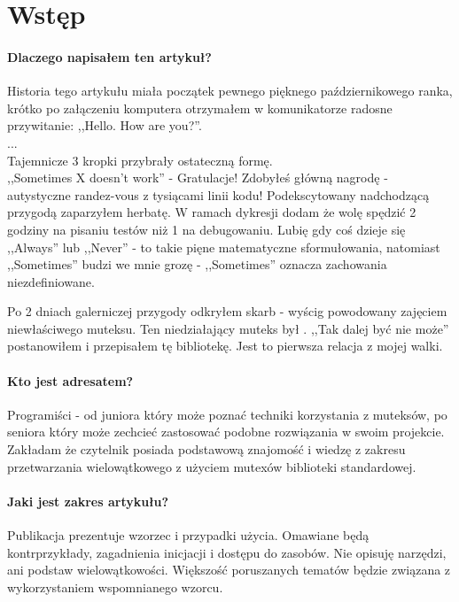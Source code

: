 \section{Wstęp}\label{sec:introduction}
\paragraph{Dlaczego napisałem ten artykuł?}
Historia tego artykułu miała początek pewnego pięknego październikowego ranka, krótko po załączeniu komputera otrzymałem w komunikatorze radosne przywitanie: ,,Hello. How are you?''.\\
...\\
Tajemnicze 3 kropki przybrały ostateczną formę.\\
,,Sometimes X doesn't work'' - Gratulacje! Zdobyłeś główną nagrodę - autystyczne randez-vous z tysiącami linii kodu! Podekscytowany nadchodzącą przygodą zaparzyłem herbatę. W ramach dykresji dodam że wolę spędzić 2 godziny na pisaniu testów niż 1 na debugowaniu. Lubię gdy coś dzieje się ,,Always'' lub ,,Never'' - to takie pięne matematyczne sformułowania, natomiast ,,Sometimes'' budzi we mnie grozę - ,,Sometimes'' oznacza zachowania niezdefiniowane.

Po 2 dniach galerniczej przygody odkryłem skarb - wyścig powodowany zajęciem niewłaściwego muteksu. Ten niedziałający muteks był . ,,Tak dalej być nie może'' postanowiłem i przepisałem tę bibliotekę. Jest to pierwsza relacja z mojej walki.

\paragraph{Kto jest adresatem?}
Programiści \Cpp{} - od juniora który może poznać techniki korzystania z muteksów, po seniora który może zechcieć zastosować podobne rozwiązania w swoim projekcie. Zakładam że czytelnik posiada podstawową znajomość  i wiedzę z zakresu przetwarzania wielowątkowego z użyciem mutexów biblioteki standardowej.

\paragraph{Jaki jest zakres artykułu?}
Publikacja prezentuje wzorzec  i przypadki użycia. Omawiane będą kontrprzykłady, zagadnienia inicjacji i dostępu do zasobów. Nie opisuję narzędzi, ani podstaw wielowątkowości. Większość poruszanych tematów będzie związana z wykorzystaniem wspomnianego wzorcu.

